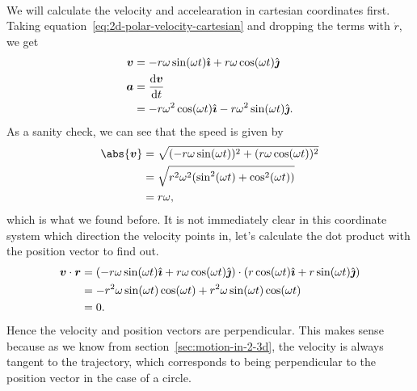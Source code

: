 \documentclass[../classical_mechanics.tex]{subfiles}
\begin{document}
        \paragraph{}
        We will calculate the velocity and accelearation in cartesian coordinates first.
        Taking equation~\ref{eq:2d-polar-velocity-cartesian} and dropping the terms with $\dot{r}$, we get
        \begin{align}
            \vec{v}&=-r\omega\sin(\omega t)\ihat+r\omega\cos(\omega t)\jhat\\
            \vec{a}&=\dv{\vec{v}}{t}\\
            &=-r\omega^2\cos(\omega t)\ihat-r\omega^2\sin(\omega t)\jhat.
        \end{align}
        As a sanity check, we can see that the speed is given by
        \begin{align}
            \abs{\vec{v}}&=\sqrt{(-r\omega\sin(\omega t))^2+(r\omega\cos(\omega t))^2}\\
            &=\sqrt{r^2\omega^2(\sin^2(\omega t)+\cos^2(\omega t))}\\
            &=r\omega,
        \end{align}
        which is what we found before.
        It is not immediately clear in this coordinate system which direction the velocity points in, let's calculate the dot product with the position vector to find out.
        \begin{align}
            \boldsymbol{v}\cdot\boldsymbol{r}&=(-r\omega\sin(\omega t)\hat{\boldsymbol{\imath}}+r\omega\cos(\omega t)\hat{\boldsymbol{\jmath}})\cdot(r\cos(\omega t)\hat{\boldsymbol{\imath}}+r\sin(\omega t)\hat{\boldsymbol{\jmath}})\\
            &=-r^2\omega\sin(\omega t)\cos(\omega t)+r^2\omega\sin(\omega t)\cos(\omega t)\\
            &=0.
        \end{align}
        Hence the velocity and position vectors are perpendicular.
        This makes sense because as we know from section~\ref{sec:motion-in-2-3d}, the velocity is always tangent to the trajectory, which corresponds to being perpendicular to the position vector in the case of a circle.
\end{document}
